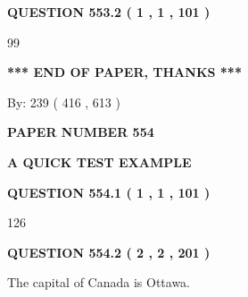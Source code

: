 \documentclass[12pt]{article}
\begin{document}
{\textbf{\Large{QUESTION
553.2 
 ( 1 , 1 , 101 )
}}}
  
  
 
 
\noindent{}

99
 
 
   
   
 \vspace{0.2in}
 
   
   
   
   
\vspace{1.0in} 
{\textbf{\large{ *** END OF PAPER, THANKS *** }}} 
   
   
\hspace{1.0in} By: 
 239 ( 416 ,  613 )
   
   
   
   
\newpage 
\setcounter{page}{ 
   554001 } 
   
   
   
   
 {\textbf{ \Large{ PAPER NUMBER  554  }}}
   
   
\vspace{0.2in}
   
   
   
   
   
   
 \vspace{0.2in}
{\LARGE {\textbf{ A QUICK TEST EXAMPLE}}}
   
   
  
\vspace{0.2in}
  
{\textbf{\Large{QUESTION
554.1 
 ( 1 , 1 , 101 )
}}}
  
  
 
 
\noindent{}

126
 
 
  
\vspace{0.2in}
  
{\textbf{\Large{QUESTION
554.2 
 ( 2 , 2 , 201 )
}}}
  
  
 
 
\noindent{}
 
 
The capital of Canada is Ottawa.
 
\end{document}
